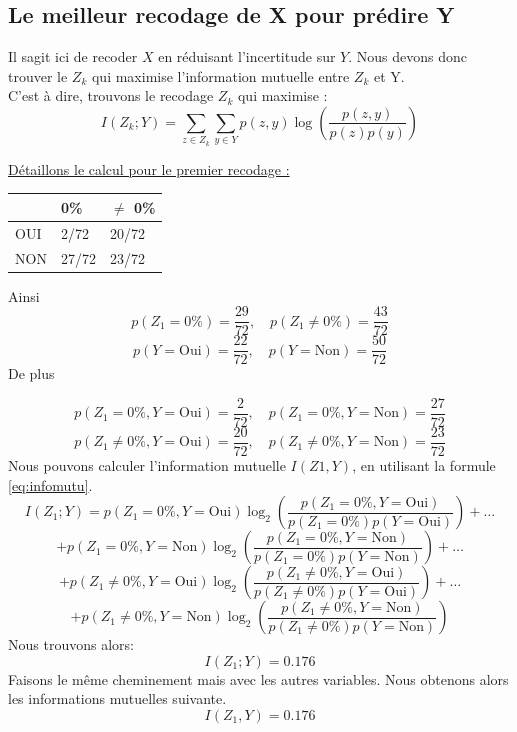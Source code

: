 \documentclass{article}
\begin{document}
\subsection{Le meilleur recodage de X pour prédire Y }

Il sagit ici de recoder $X$ en réduisant l'incertitude sur $Y$.
Nous devons donc trouver le $Z_k$ qui maximise l'information mutuelle entre $Z_k$ et Y.
\\
C'est à dire, trouvons le recodage $Z_k$ qui maximise :
\begin{equation}
  I(Z_k; Y) = \sum_{z\in Z_k} \sum_{y \in Y} p(z, y) \log \left( \frac{p(z, y)}{p(z)p(y)} \right)
  \label{eq:infomutu}
\end{equation}

\underline{Détaillons le calcul pour le premier recodage :}

\begin{table}[H]
  \centering
  \begin{tabular}{|l|l|l|}
  \hline
      & 0\%   & $\neq$ 0\% \\ \hline
  OUI & 2/72  & 20/72 \\ \hline
  NON & 27/72 & 23/72 \\ \hline
  \end{tabular}
  \end{table}
Ainsi
\[
p(Z_1 = 0\%) = \frac{29}{72}, \quad p(Z_1 \neq 0\%) = \frac{43}{72}
\]
\[
p(Y = \text{Oui}) = \frac{22}{72}, \quad p(Y = \text{Non}) = \frac{50}{72}
\]
De plus

\[
p(Z_1 = 0\%, Y = \text{Oui}) = \frac{2}{72}, \quad p(Z_1 = 0\%, Y = \text{Non}) = \frac{27}{72}
\]
\[
p(Z_1 \neq 0\%, Y = \text{Oui}) = \frac{20}{72}, \quad p(Z_1 \neq 0\%, Y = \text{Non}) = \frac{23}{72}
\]
Nous pouvons calculer l'information mutuelle $I(Z1,Y)$, en utilisant la formule \ref{eq:infomutu}.
\[
I(Z_1; Y) = p(Z_1 = 0\%, Y = \text{Oui}) \log_2 \left(\frac{p(Z_1 = 0\%, Y = \text{Oui})}{p(Z_1 = 0\%) p(Y = \text{Oui})}\right) + \ldots
\]
\[
+ p(Z_1 = 0\%, Y = \text{Non}) \log_2 \left(\frac{p(Z_1 = 0\%, Y = \text{Non})}{p(Z_1 = 0\%) p(Y = \text{Non})}\right) + \ldots
\]
\[
+ p(Z_1 \neq 0\%, Y = \text{Oui}) \log_2 \left(\frac{p(Z_1 \neq 0\%, Y = \text{Oui})}{p(Z_1 \neq 0\%) p(Y = \text{Oui})}\right) + \ldots
\]
\[
+ p(Z_1 \neq 0\%, Y = \text{Non}) \log_2 \left(\frac{p(Z_1 \neq 0\%, Y = \text{Non})}{p(Z_1 \neq 0\%) p(Y = \text{Non})}\right)
\]
Nous trouvons alors:
\[
  I(Z_1; Y)= 0.176
\]
Faisons le même cheminement mais avec les autres variables. Nous obtenons alors les informations mutuelles suivante.
\[
I(Z_1,Y) = 0.176
\]
\end{document}
